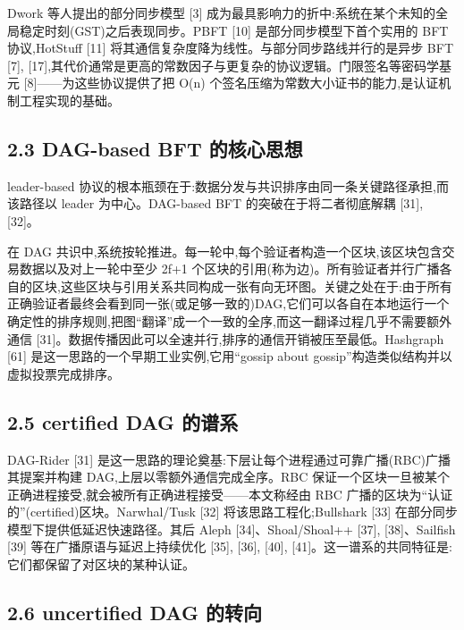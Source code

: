\documentclass[UTF8,fontset=windows,a4paper,11pt]{ctexart}
\begin{document}
Dwork 等人提出的部分同步模型 {[}3{]}
成为最具影响力的折中:系统在某个未知的全局稳定时刻(GST)之后表现同步。PBFT
{[}10{]} 是部分同步模型下首个实用的 BFT 协议,HotStuff {[}11{]}
将其通信复杂度降为线性。与部分同步路线并行的是异步 BFT {[}7{]}, {[}17{]},其代价通常是更高的常数因子与更复杂的协议逻辑。门限签名等密码学基元 {[}8{]}------为这些协议提供了把 O(n)
个签名压缩为常数大小证书的能力,是认证机制工程实现的基础。

\subsection{2.3 DAG-based BFT
的核心思想}\label{dag-based-bft-ux7684ux6838ux5fc3ux601dux60f3}

leader-based
协议的根本瓶颈在于:数据分发与共识排序由同一条关键路径承担,而该路径以
leader 为中心。DAG-based BFT 的突破在于将二者彻底解耦 {[}31{]},
{[}32{]}。

在 DAG
共识中,系统按轮推进。每一轮中,每个验证者构造一个区块,该区块包含交易数据以及对上一轮中至少
2f+1
个区块的引用(称为边)。所有验证者并行广播各自的区块,这些区块与引用关系共同构成一张有向无环图。关键之处在于:由于所有正确验证者最终会看到同一张(或足够一致的)DAG,它们可以各自在本地运行一个确定性的排序规则,把图``翻译''成一个一致的全序,而这一翻译过程几乎不需要额外通信
{[}31{]}。数据传播因此可以全速并行,排序的通信开销被压至最低。Hashgraph
{[}61{]} 是这一思路的一个早期工业实例,它用``gossip about
gossip''构造类似结构并以虚拟投票完成排序。

\subsection{2.5 certified DAG
的谱系}\label{certified-dag-ux7684ux8c31ux7cfb}

DAG-Rider {[}31{]}
是这一思路的理论奠基:下层让每个进程通过可靠广播(RBC)广播其提案并构建 DAG,上层以零额外通信完成全序。RBC 保证一个区块一旦被某个正确进程接受,就会被所有正确进程接受------本文称经由 RBC 广播的区块为``认证的''(certified)区块。Narwhal/Tusk {[}32{]} 将该思路工程化;Bullshark {[}33{]} 在部分同步模型下提供低延迟快速路径。其后 Aleph {[}34{]}、Shoal/Shoal++ {[}37{]}, {[}38{]}、Sailfish {[}39{]} 等在广播原语与延迟上持续优化 {[}35{]}, {[}36{]}, {[}40{]}, {[}41{]}。这一谱系的共同特征是:它们都保留了对区块的某种认证。

\subsection{2.6 uncertified DAG
的转向}\label{uncertified-dag-ux7684ux8f6cux5411}
\end{document}
